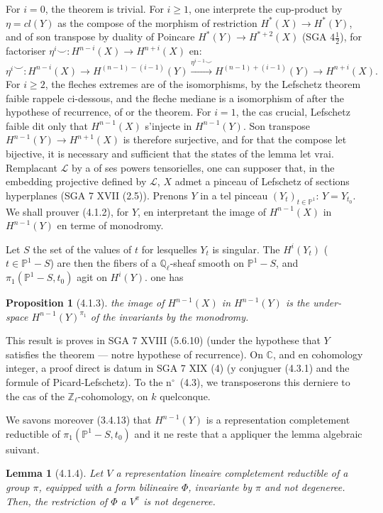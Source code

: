 \documentclass[12pt,a4paper]{article}
\theoremstyle{plain}
\newtheorem{lemma}[theorem]{Lemma}
\newtheorem{proposition}[theorem]{Proposition}
\theoremstyle{definition}
\theoremstyle{remark}
\newcommand{\bbC}{\mathbb{C}}
\newcommand{\bbP}{\mathbb{P}}
\newcommand{\scrL}{\mathscr{L}}
\newcommand{\Zl}{\mathbb{Z}_\ell}
\newcommand{\Ql}{\mathbb{Q}_\ell}
\begin{document}
For $i=0$, the theorem is trivial. For $i \geq 1$, one interprete the cup-product by $\eta = cl(Y)$ as the compose of the morphism of restriction $H^*(X) \to H^*(Y)$, and of son transpose by duality of Poincare $H^*(Y) \to H^{*+2}(X)$ (SGA $4\frac{1}{2}$), for factoriser $\eta^i \smile : H^{n-i}(X) \to H^{n+i}(X)$ en:
\[
\eta^i \smile : H^{n-i}(X) \to H^{(n-1)-(i-1)}(Y) \xrightarrow{\eta^{i-1} \smile} H^{(n-1)+(i-1)}(Y) \to H^{n+i}(X).
\]
For $i \geq 2$, the fleches extremes are of the isomorphisms, by the Lefschetz theorem faible rappele ci-dessous, and the fleche mediane is a isomorphism of after the hypothese of recurrence, of or the theorem. For $i=1$, the cas crucial, Lefschetz faible dit only that $H^{n-1}(X)$ s'injecte in $H^{n-1}(Y)$. Son transpose $H^{n-1}(Y) \to H^{n+1}(X)$ is therefore surjective, and for that the compose let bijective, it is necessary and sufficient that the states of the lemma let vrai. Remplacant $\scrL$ by a of ses powers tensorielles, one can supposer that, in the embedding projective defined by $\scrL$, $X$ admet a pinceau of Lefschetz of sections hyperplanes (SGA 7 XVII (2.5)). Prenons $Y$ in a tel pinceau $(Y_t)_{t \in \bbP^1}$: $Y = Y_{t_0}$. We shall prouver (4.1.2), for $Y$, en interpretant the image of $H^{n-1}(X)$ in $H^{n-1}(Y)$ en terme of monodromy.

Let $S$ the set of the values of $t$ for lesquelles $Y_t$ is singular. The $H^i(Y_t)$ ($t \in \bbP^1 - S$) are then the fibers of a $\Ql$-sheaf smooth on $\bbP^1 - S$, and $\pi_1(\bbP^1 - S, t_0)$ agit on $H^i(Y)$. one has

\begin{proposition}[4.1.3]
the image of $H^{n-1}(X)$ in $H^{n-1}(Y)$ is the under-space $H^{n-1}(Y)^{\pi_1}$ of the invariants by the monodromy.
\end{proposition}

This result is proves in SGA 7 XVIII (5.6.10) (under the hypothese that $Y$ satisfies the theorem --- notre hypothese of recurrence). On $\bbC$, and en cohomology integer, a proof direct is datum in SGA 7 XIX (4) (y conjuguer (4.3.1) and the formule of Picard-Lefschetz). To the n$^\circ$~(4.3), we transposerons this derniere to the cas of the $\Zl$-cohomology, on $k$ quelconque.

We savons moreover (3.4.13) that $H^{n-1}(Y)$ is a representation completement reductible of $\pi_1(\bbP^1 - S, t_0)$ and it ne reste that a appliquer the lemma algebraic suivant.

\begin{lemma}[4.1.4]
Let $V$ a representation lineaire completement reductible of a group $\pi$, equipped with a form bilineaire $\Phi$, invariante by $\pi$ and not degeneree. Then, the restriction of $\Phi$ a $V^\pi$ is not degeneree.
\end{lemma}
\end{document}
